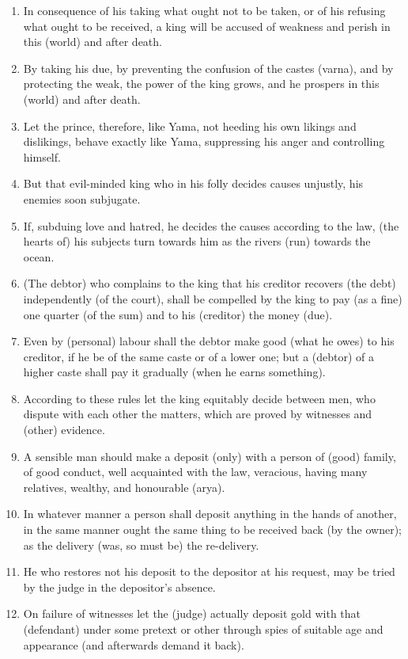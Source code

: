 \begin{enumerate}
\item In consequence of his taking what ought not to be taken, or of his refusing what ought to be received, a king will be accused of weakness and perish in this (world) and after death.
\item By taking his due, by preventing the confusion of the castes (varna), and by protecting the weak, the power of the king grows, and he prospers in this (world) and after death.
\item Let the prince, therefore, like Yama, not heeding his own likings and dislikings, behave exactly like Yama, suppressing his anger and controlling himself.
\item But that evil-minded king who in his folly decides causes unjustly, his enemies soon subjugate.
\item If, subduing love and hatred, he decides the causes according to the law, (the hearts of) his subjects turn towards him as the rivers (run) towards the ocean.
\item (The debtor) who complains to the king that his creditor recovers (the debt) independently (of the court), shall be compelled by the king to pay (as a fine) one quarter (of the sum) and to his (creditor) the money (due).
\item Even by (personal) labour shall the debtor make good (what he owes) to his creditor, if he be of the same caste or of a lower one; but a (debtor) of a higher caste shall pay it gradually (when he earns something).
\item According to these rules let the king equitably decide between men, who dispute with each other the matters, which are proved by witnesses and (other) evidence.
\item A sensible man should make a deposit (only) with a person of (good) family, of good conduct, well acquainted with the law, veracious, having many relatives, wealthy, and honourable (arya).
\item In whatever manner a person shall deposit anything in the hands of another, in the same manner ought the same thing to be received back (by the owner); as the delivery (was, so must be) the re-delivery.
\item He who restores not his deposit to the depositor at his request, may be tried by the judge in the depositor's absence.
\item On failure of witnesses let the (judge) actually deposit gold with that (defendant) under some pretext or other through spies of suitable age and appearance (and afterwards demand it back).

\end{enumerate}
